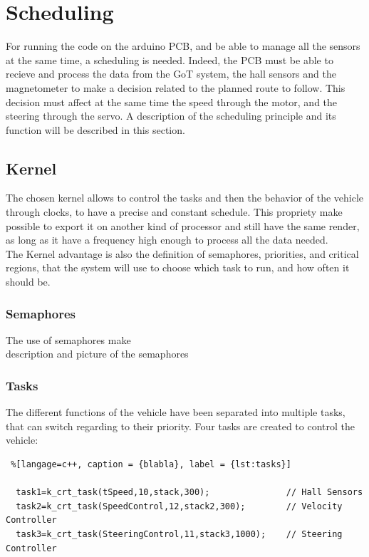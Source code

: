 \section{Scheduling}
For running the code on the arduino PCB, and be able to manage all the sensors at the same time, a scheduling is needed. Indeed, the PCB must be able to recieve and process the data from the GoT system, the hall sensors and the magnetometer to make a decision related to the planned route to follow. This decision must affect at the same time the speed through the motor, and the steering through the servo.
A description of the scheduling principle and its function will be described in this section.


\subsection{Kernel}
The chosen kernel allows to control the tasks and then the behavior of the vehicle through clocks, to have a precise and constant schedule. This propriety make possible to export it on another kind of processor and still have the same render, as long as it have a frequency high enough to process all the data needed.\\
The Kernel advantage is also the definition of semaphores, priorities, and critical regions, that the system will use to choose which task to run, and how often it should be.


\subsubsection{Semaphores}
The use of semaphores make 
\\
description and picture of the semaphores

\subsubsection{Tasks}
The different functions of the vehicle have been separated into multiple tasks, that can switch regarding to their priority. Four tasks are created to control the vehicle:

\begin{lstlisting} %[langage=c++, caption = {blabla}, label = {lst:tasks}]

  task1=k_crt_task(tSpeed,10,stack,300);               // Hall Sensors
  task2=k_crt_task(SpeedControl,12,stack2,300);        // Velocity Controller
  task3=k_crt_task(SteeringControl,11,stack3,1000);    // Steering Controller

\end{lstlisting}

